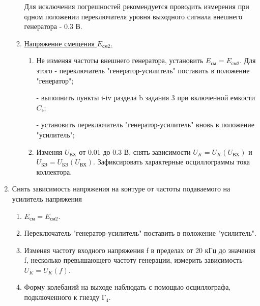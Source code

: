 \begin{enumerate}
\begin{enumerate}
\begin{enumerate}
		\end{enumerate}
	Для исключения погрешностей рекомендуется проводить измерения при одном положении переключателя уровня выходного сигнала внешнего генератора - 0.3 В.
		\item \underline{Напряжение смещения $E_\text{см2}$.}
		\begin{enumerate}
				\item Не изменяя частоты внешнего генератора, установить $E_\text{см}=E_\text{см2}$. Для этого 
			    - переключатель "генератор-усилитель" поставить в положение "генератор";

			    - выполнить пункты i-iv раздела b задания 3 при включенной емкости $C_{\text{э}}$;

			    - установить переключатель "генератор-усилитель" вновь в положение "усилитель"; 
				\item Изменяя $U_\text{ВХ}$ от 0.01 до 0.3 В, снять зависимости $U_K=U_K(U_\text{ВХ})$ и $U_\text{БЭ}=U_\text{БЭ}(U_\text{ВХ})$. Зафиксировать характерные осциллограммы тока коллектора.
		\end{enumerate}
	\end{enumerate}
	\item Снять зависимость напряжения на контуре от частоты подаваемого на усилитель напряжения
		\begin{enumerate}  
			\item $E_{\text{см}} = E_{\text{см2}}$.
			\item Переключатель "генератор-усилитель" поставить в положение "усилитель".
			\item Изменяя частоту входного напряжения f в пределах от 20 кГц до значения f, несколько превышающего частоту генерации, измерить зависимость $U_K=U_K(f)$.
			\item Форму колебаний на выходе наблюдать с помощью осциллографа, подключенного к гнезду $\text{Г}_4$. 
		\end{enumerate}
\end{enumerate}

